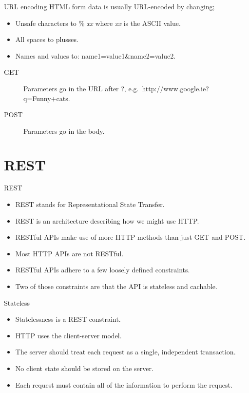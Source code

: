 \begin{frame}{URL encoding}
  HTML form data is usually URL-encoded by changing;
  \begin{itemize}
    \item Unsafe characters to \% \emph{xx} where \emph{xx} is the ASCII value.
    \item All spaces to plusses.
    \item Names and values to: name1=value1\&name2=value2.
  \end{itemize}
  
  \begin{description}
    \item[GET] Parameters go in the URL after ?, e.g.\ http://www.google.ie?q=Funny+cats.
    \item[POST] Parameters go in the body.
  \end{description}
\end{frame}

\section{REST}

\begin{frame}{REST}
  \begin{itemize}
    \item REST stands for Representational State Transfer.
    \item REST is an architecture describing how we might use HTTP.
    \item RESTful APIs make use of more HTTP methods than just GET and POST.
    \item Most HTTP APIs are not RESTful.
    \item RESTful APIs adhere to a few loosely defined constraints.
    \item Two of those constraints are that the API is stateless and cachable.
  \end{itemize}
\end{frame}

\begin{frame}{Stateless}
  \begin{itemize}
    \item Statelessness is a REST constraint.
    \item HTTP uses the client-server model.
    \item The server should treat each request as a single, independent transaction.
    \item No client state should be stored on the server.
    \item Each request must contain all of the information to perform the request. 
  \end{itemize}
\end{frame}


